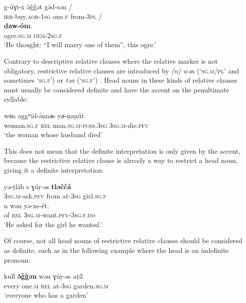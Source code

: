 \documentclass[output=paper]{langsci/langscibook}
\begin{document}
\begin{exe}
\ex\label{5ex:32}
\gll	g-úɣi-x	ə́ǧǧət	gə́d-sən	/ \\
	{\textsc{irr}}-buy.{\textsc{aor-1sg}}	one.{\textsc{f}}	from-{\textsc{3pl}}	/ \\
\glt
\exi{}
	{\textbf{daw-óm}}. \\
	ogre.{\textsc{sg.m}}	{\textsc{dem-2sg.f}} \\
\glt `He thought: ``I will marry one of them'', this ogre.'
\end{exe}

Contrary to descriptive relative clauses where the relative marker is not obligatory, restrictive relative clauses are introduced by {\emph{(n) wən}} (`{\textsc{sg.m/pl}}' and sometimes `{\textsc{sg.f}}') or {\emph{tən}} (`{\textsc{sg.f}}') \citep{schiattarella:14}. Head nouns in these kinds of relative clauses must usually be considered definite and have the accent on the penultimate syllable:

\begin{exe}
\ex\label{5ex:33}
	wәn	aggʷid-ə́nnәs	yә-ṃṃút \\
	woman.{\textsc{sg.f}}	{\textsc{rel}}	 man.{\textsc{sg.m-poss.3sg}} 	{\textsc{3sg.m}}-die.{\textsc{pfv}} \\
\glt	`the woman whose husband died'
\end{exe}

This does not mean that the definite interpretation is only given by the accent, because the restrictive relative clause is already a way to restrict a head noun, giving it a definite interpretation:

\begin{exe}
\ex\label{5ex:34}
\gll	yə-ṭlə́b	s	ɣúṛ-əs	{\textbf{tləččá}} \\
	{\textsc{3sg.m}}-ask.{\textsc{pfv}}	from	at-{\textsc{3sg}}	girl.{\textsc{sg.f}} \\
\glt
\exi{}
\gll	n	wən	yə-xs-ét. \\
	of	{\textsc{rel}}	{\textsc{3sg.m}}-want.{\textsc{pfv-3sg.f.do}} \\
\glt	`He asked for the girl he wanted.'
\end{exe}

Of course, not all head nouns of restrictive relative clauses should be considered as definite, such as in the following example where the head is an indefinite pronoun:

\begin{exe}
\ex\label{5ex:35}
\gll	kull	{\textbf{ə́ǧǧən}}	wən	ɣúṛ-əs	aṭíl \\
	every	one.{\textsc{m}}	{\textsc{rel}}	at-{\textsc{3sg}}	garden.{\textsc{sg.m}} \\
\glt	`everyone who has a garden'
\end{exe}
\end{document}
